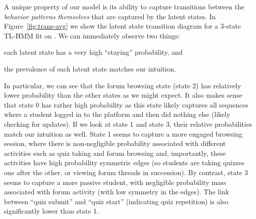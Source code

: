 A unique property of our model is its ability to capture transitions
between the \emph{behavior patterns themselves} that are captured by the
latent states. In Figure~\ref{fig:trans-avg} we show the latent state
transition diagram for a 3-state TL-HMM fit on \textretrieval{}. We can
immediately observe two things: \begin{enumerate*}[label=(\arabic*)]
  \item each latent state has a very high ``staying'' probability, and
  \item the prevalence of each latent state matches our intuition.
\end{enumerate*}
In particular, we can see that the forum browsing state (state 2) has
relatively lower probability than the other states as we might expect. It
also makes sense that state 0 has rather high probability as this state
likely captures all sequences where a student logged in to the platform and
then did nothing else (likely checking for updates). If we look at state 1
and state 3, their relative probabilities match our intuition as
well. State 1 seems to capture a more engaged browsing session, where there
is non-negligible probability associated with different activities such as
quiz taking and forum browsing and, importantly, these activities have high
probability symmetric edges (so students are taking quizzes one after the
other, or viewing forum threads in succession). By contrast, state 3 seems
to capture a more passive student, with negligible probability mass
associated with forum activity (with low symmetry in the edges). The link
between ``quiz submit'' and ``quiz start'' (indicating quiz repetition) is
also significantly lower than state 1.

